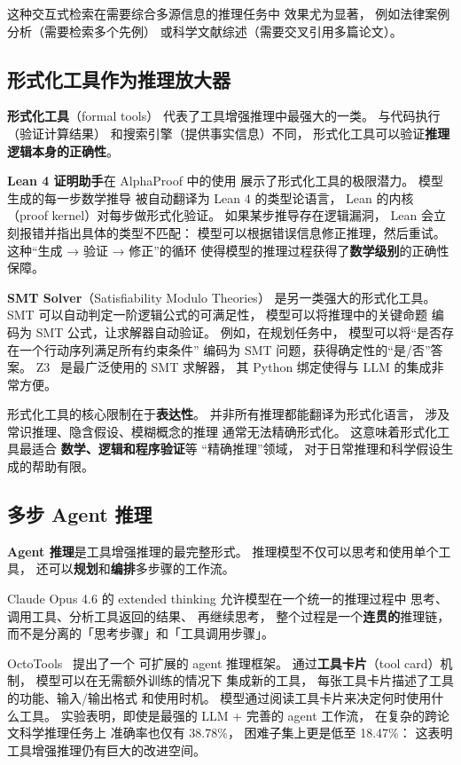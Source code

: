 这种交互式检索在需要综合多源信息的推理任务中
效果尤为显著，
例如法律案例分析（需要检索多个先例）
或科学文献综述（需要交叉引用多篇论文）。

\subsection{形式化工具作为推理放大器}

\textbf{形式化工具}（formal tools）
代表了工具增强推理中最强大的一类。
与代码执行（验证计算结果）
和搜索引擎（提供事实信息）不同，
形式化工具可以验证\textbf{推理逻辑本身的正确性}。

\textbf{Lean 4 证明助手}在 AlphaProof 中的使用
展示了形式化工具的极限潜力。
模型生成的每一步数学推导
被自动翻译为 Lean 4 的类型论语言，
Lean 的内核（proof kernel）对每步做形式化验证。
如果某步推导存在逻辑漏洞，
Lean 会立刻报错并指出具体的类型不匹配：
模型可以根据错误信息修正推理，然后重试。
这种“生成 → 验证 → 修正”的循环
使得模型的推理过程获得了\textbf{数学级别}的正确性保障。

\textbf{SMT Solver}（Satisfiability Modulo Theories）
是另一类强大的形式化工具。
SMT 可以自动判定一阶逻辑公式的可满足性，
模型可以将推理中的关键命题
编码为 SMT 公式，让求解器自动验证。
例如，在规划任务中，
模型可以将“是否存在一个行动序列满足所有约束条件”
编码为 SMT 问题，获得确定性的“是/否”答案。
Z3~\cite{demoura2008z3}
是最广泛使用的 SMT 求解器，
其 Python 绑定使得与 LLM 的集成非常方便。

形式化工具的核心限制在于\textbf{表达性}。
并非所有推理都能翻译为形式化语言，
涉及常识推理、隐含假设、模糊概念的推理
通常无法精确形式化。
这意味着形式化工具最适合
\textbf{数学、逻辑和程序验证}等
“精确推理”领域，
对于日常推理和科学假设生成的帮助有限。

\subsection{多步 Agent 推理}

\textbf{Agent 推理}是工具增强推理的最完整形式。
推理模型不仅可以思考和使用单个工具，
还可以\textbf{规划}和\textbf{编排}多步骤的工作流。

Claude Opus 4.6 的 extended thinking
允许模型在一个统一的推理过程中
思考、调用工具、分析工具返回的结果、
再继续思考，
整个过程是一个\textbf{连贯的}推理链，
而不是分离的「思考步骤」和「工具调用步骤」。

OctoTools~\cite{lu2025octotools} 提出了一个
可扩展的 agent 推理框架。
通过\textbf{工具卡片}（tool card）机制，
模型可以在无需额外训练的情况下
集成新的工具，
每张工具卡片描述了工具的功能、输入/输出格式
和使用时机。
模型通过阅读工具卡片来决定何时使用什么工具。
实验表明，即使是最强的 LLM + 完善的 agent 工作流，
在复杂的跨论文科学推理任务上
准确率也仅有 38.78\%，
困难子集上更是低至 18.47\%：
这表明工具增强推理仍有巨大的改进空间。


